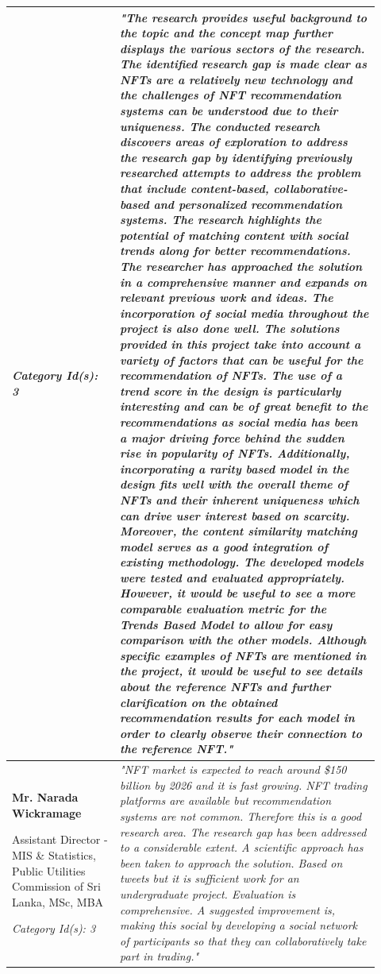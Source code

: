 \begin{longtable}{|p{0.27\linewidth}|p{0.655\linewidth}|}
\textit{Category Id(s): 3}
 & 
 \textit{"The research provides useful background to the topic and the concept map further displays the various sectors of the research. The identified research gap is made clear as NFTs are a relatively new technology and the challenges of NFT recommendation systems can be understood due to their uniqueness. 
 The conducted research discovers areas of exploration to address the research gap by identifying previously researched attempts to address the problem that include content-based, collaborative-based and personalized recommendation systems. The research highlights the potential of matching content with social trends along for better recommendations. 
 The researcher has approached the solution in a comprehensive manner and expands on relevant previous work and ideas. The incorporation of social media throughout the project is also done well.
 The solutions provided in this project take into account a variety of factors that can be useful for the recommendation of NFTs. The use of a trend score in the design is particularly interesting and can be of great benefit to the recommendations as social media has been a major driving force behind the sudden rise in popularity of NFTs. Additionally, incorporating a rarity based model in the design fits well with the overall theme of NFTs and their inherent uniqueness which can drive user interest based on scarcity. Moreover, the content similarity matching model serves as a good integration of existing methodology.
 The developed models were tested and evaluated appropriately. However, it would be useful to see a more comparable evaluation metric for the Trends Based Model to allow for easy comparison with the other models.
 Although specific examples of NFTs are mentioned in the project, it would be useful to see details about the reference NFTs and further clarification on the obtained recommendation results for each model in order to clearly observe their connection to the reference NFT."}
 \\
 \hline
\textbf{Mr. Narada Wickramage}

Assistant Director - MIS \& Statistics, Public Utilities Commission of Sri Lanka, MSc, MBA

\textit{Category Id(s): 3}
& 
 \textit{"NFT market is expected to reach around \$150 billion by 2026 and it is fast growing. NFT trading platforms are available but recommendation systems are not common. Therefore this is a good research area. The research gap has been addressed to a considerable extent. A scientific approach has been taken to approach the solution. Based on tweets but it is sufficient work for an undergraduate project. Evaluation is comprehensive. A suggested improvement is, making this social by developing a social network of participants so that they can collaboratively take part in trading."}
 \\


\end{longtable}
